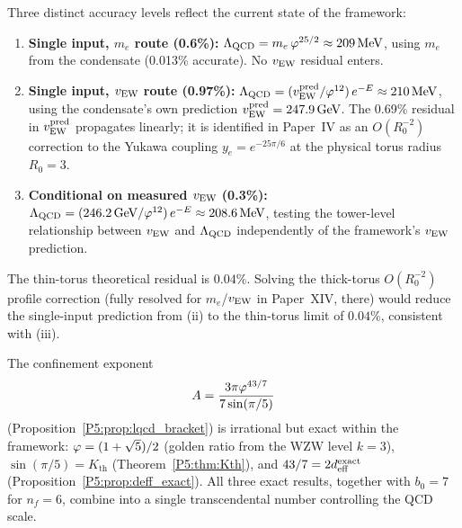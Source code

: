 \begin{remark}
\label{P5:rem:lqcd_accuracy_levels}
Three distinct accuracy levels reflect the current state of the framework:
\begin{enumerate}[noitemsep,label=(\roman*)]
\item \textbf{Single input, $m_e$ route (0.6\%):}
  $\Lambda_{\mathrm{QCD}} = m_e\,\varphi^{25/2}\approx209\,\mathrm{MeV}$, using $m_e$ from
  the condensate (0.013\% accurate). No $v_{\mathrm{EW}}$ residual enters.
\item \textbf{Single input, $v_{\mathrm{EW}}$ route (0.97\%):}
  $\Lambda_{\mathrm{QCD}} = (v_{\mathrm{EW}}^{\rm pred}/\varphi^{12})\,e^{-E}\approx210\,\mathrm{MeV}$,
  using the condensate's own prediction $v_{\mathrm{EW}}^{\rm pred}=247.9\,\mathrm{GeV}$.
  The 0.69\% residual in $v_{\mathrm{EW}}^{\rm pred}$ propagates linearly; it is
  identified in Paper~IV as an $O(R_0^{-2})$ correction to the Yukawa
  coupling $y_e=e^{-25\pi/6}$ at the physical torus radius $R_0=3$.
\item \textbf{Conditional on measured $v_{\mathrm{EW}}$ (0.3\%):}
  $\Lambda_{\mathrm{QCD}} = (246.2\,\mathrm{GeV}/\varphi^{12})\,e^{-E}\approx208.6\,\mathrm{MeV}$,
  testing the tower-level relationship between $v_{\mathrm{EW}}$ and $\Lambda_{\mathrm{QCD}}$
  independently of the framework's $v_{\mathrm{EW}}$ prediction.
\end{enumerate}
The thin-torus theoretical residual is $0.04\%$. Solving the
thick-torus $O(R_0^{-2})$ profile correction (fully resolved for
$m_e$/$v_{\mathrm{EW}}$ in Paper~XIV,  there) would reduce the
single-input prediction from (ii) to the thin-torus limit of $0.04\%$,
consistent with (iii).
\end{remark}

\begin{remark}
\label{P5:rem:exact_exponent}
The confinement exponent
\begin{equation}
  A = \frac{3\pi\varphi^{43/7}}{7\sin(\pi/5)}
\end{equation}
(Proposition~\ref{P5:prop:lqcd_bracket}) is irrational but exact within
the framework: $\varphi=(1+\sqrt5)/2$ (golden ratio from the WZW level
$k=3$), $\sin(\pi/5)=K_{\mathrm{th}}$ (Theorem~\ref{P5:thm:Kth}), and
$43/7=2d_{\mathrm{eff}}^{\mathrm{exact}}$ (Proposition~\ref{P5:prop:deff_exact}).
All three exact results, together with $b_0=7$ for $n_f=6$, combine
into a single transcendental number controlling the QCD scale.
\end{remark}

